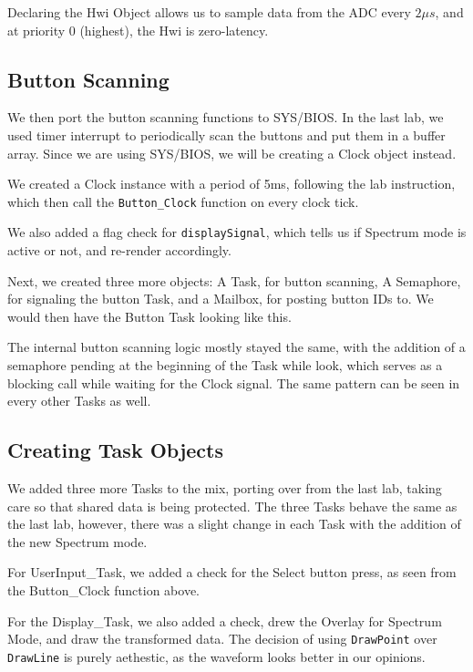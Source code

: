 \documentclass[12pt,oneside,letterpaper]{article}
\begin{document}
Declaring the Hwi Object allows us to sample data from the ADC every $2\mu s$, and at priority 0 (highest), the Hwi is zero-latency.

\subsection{Button Scanning}
We then port the button scanning functions to SYS/BIOS. In the last lab, we used timer interrupt to periodically scan the buttons and put them in a buffer array. Since we are using SYS/BIOS, we will be creating a Clock object instead. 

We created a Clock instance with a period of 5ms, following the lab instruction, which then call the \texttt{Button\_Clock} function on every clock tick. 



We also added a flag check for \texttt{displaySignal}, which tells us if Spectrum mode is active or not, and re-render accordingly.

Next, we created three more objects: A Task, for button scanning, A Semaphore, for signaling the button Task, and a Mailbox, for posting button IDs to. We would then have the Button Task looking like this. 



The internal button scanning logic mostly stayed the same, with the addition of a semaphore pending at the beginning of the Task while look, which serves as a blocking call while waiting for the Clock signal. The same pattern can be seen in every other Tasks as well.

\subsection{Creating Task Objects}
We added three more Tasks to the mix, porting over from the last lab, taking care so that shared data is being protected. The three Tasks behave the same as the last lab, however, there was a slight change in each Task with the addition of the new Spectrum mode.

For UserInput\_Task, we added a check for the Select button press, as seen from the Button\_Clock function above. 



For the Display\_Task, we also added a check, drew the Overlay for Spectrum Mode, and draw the transformed data. The decision of using \texttt{DrawPoint} over \texttt{DrawLine} is purely aethestic, as the waveform looks better in our opinions.
\end{document}
